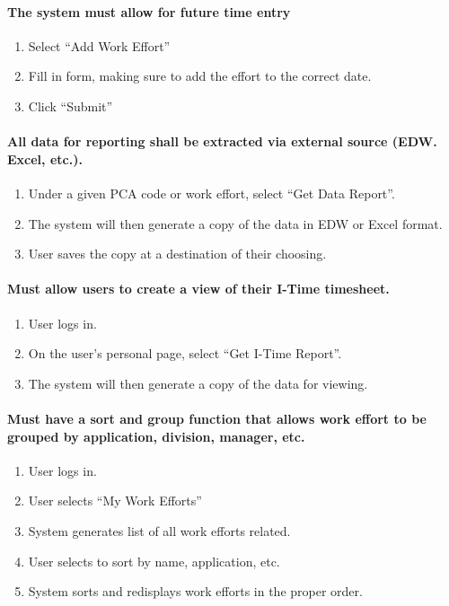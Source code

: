 \documentclass[letterpaper]{article}
\begin{document}
\paragraph{The system must allow for future time entry}
\begin{enumerate}
\item Select ``Add Work Effort''
\item Fill in form, making sure to add the effort to the correct date.
\item Click ``Submit''
\end{enumerate}

\paragraph{All data for reporting shall be extracted via external source (EDW. Excel, etc.).}
\begin{enumerate}
\item Under a given PCA code or work effort, select ``Get Data Report''.
\item The system will then generate a copy of the data in EDW or Excel format.
\item User saves the copy at a destination of their choosing.
\end{enumerate}

\paragraph{Must allow users to create a view of their I-Time timesheet.}
\begin{enumerate}
\item User logs in.
\item On the user's personal page, select ``Get I-Time Report''.
\item The system will then generate a copy of the data for viewing.
\end{enumerate}

\paragraph{Must have a sort and group function that allows work effort to be grouped by application, division, manager, etc.}
\begin{enumerate}
\item User logs in.
\item User selects ``My Work Efforts''
\item System generates list of all work efforts related.
\item User selects to sort by name, application, etc.
\item System sorts and redisplays work efforts in the proper order.
\end{enumerate}
\end{document}
